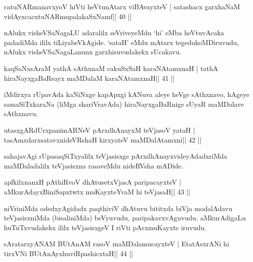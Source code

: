 \begin{shl}
catuNARmanavxyoV hiVti heVtunA\s tarx viBAvayxteV |
satashacx garxhaNaM vidAyxcacxtuNARmupalakaSxNamf\hfill || 40 ||
\end{shl}

\begin{artha}
nAlukx visheVSaNagaLU adaralilx seVriveyeMdu `hi' eMba heVtuvAcaka padadiMda ililx tiLiyabeVkAgide. `sataH' eMdu mAtarx tegedukoMDiruvudu, nAlukx visheVSaNagaLanunx garxhisuvudakekx sUcakavu.
\end{artha}

\begin{shl}
kaqSaNxsAraM yathA sAthxnaM cakuSxSaH karaNAtamxnaH |
tathA hiraNayxgaBaRsayx maMDalaM karaNAtamxnaH\hfill || 41 ||
\end{shl}

\begin{artha}
iMdirxya rUpavAda kaNiNxge kapApxgi kANuva aleye heVge sAthxnavo, hAgeye samaSiTxkaraNa (liMga shariVravAda) hiraNayxgaBaRnige sUyaR maMDalave sAthxnavu.
\end{artha}



\begin{shl}
utasxgARdUrxpanimARNeV pArxdhAnayxM teVjasoV yataH |
tasAmxdarxsatavxnideVRshaH kirxyateV maMDalAtamxni\hfill || 42 ||
\end{shl}

\begin{artha}
sahajavAgi rUpasaqSiTxyalilx teVjasisxge pArxdhAnayxvideyAdadxriMda maMDaladalilx teVjasisxna rasaveMdu nideRVsha mADide.
\end{artha}



\begin{shl}
apfkilxnanxH pAthiRvoV dhAtusetxVjasA paripacayxteV |
aMkurAdayxBiniSapxtwtx muKayxteYvaM hi teVjasaH\hfill || 43 ||
\end{shl}

\begin{artha}
niVriniMda odedxyAgidadx paqthiviV dhAtuvu bititxda biVja modalAdavu teVjasisxniMda (bisaliniMda) beVyuvudu, paripakavxvAguvudu. aMkurAdigaLu huTuTxvudakekx ililx teVjasisxgeV I riVti pArxmuKayxte iruvudu.
\end{artha}

\begin{shl}
sAratarxyANAM BUtAnAM rasoV maMDalamucayxteV |
EtatAsxrANi hi tirxVNi BUtAnAyxhuviRpashicxtaH\hfill || 44 ||
\end{shl}

